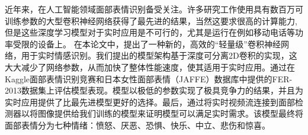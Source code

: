 \documentclass[master]{thesis-uestc}
\begin{document}
\begin{chineseabstract}
近年来，在人工智能领域面部表情识别备受关注。许多研究工作使用具有数百万可训练参数的大型卷积神经网络获得了最先进的结果，当然这要求很高的计算能力, 但是这些深度学习模型对于实时应用是不可行的，尤其是运行在例如移动电话等功率受限的设备上。
在本论文中，提出了一种新的，高效的“轻量级”卷积神经网络，用于实时情感识别。我们提出的模型架构基于深度可分离2D卷积的实现，这大大减少了网络参数，从而加快了整体性能速度，使其适用于实时应用。通过在Kaggle面部表情识别竞赛和日本女性面部表情（JAFFE）数据库中提供的FER-2013数据集上评估模型表现。模型以极低的参数实现了极具竞争力的结果，并且为实时应用提供了比最先进模型更好的选择。最后，通过将实时视频流连接到面部检测器以将图像提供给我们训练的模型来证明模型可以满足实时需求。该模型最终将面部表情分为七种情绪：愤怒、厌恶、恐惧、快乐、中立、悲伤和惊喜。

\end{chineseabstract}
\end{document}
